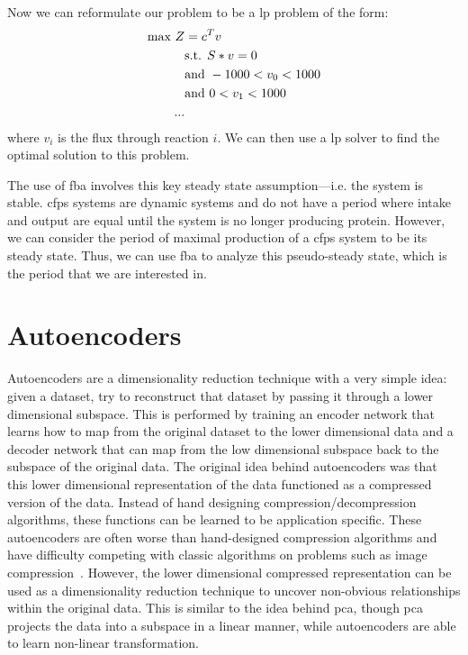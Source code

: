 Now we can reformulate our problem to be a \gls{lp} problem of the form:
\begin{equation}
\centering
\begin{split}
\text{max } Z &= c^Tv \\
&\text{s.t. } S * v = 0 \\
&\text{and } -1000 < v_0 < 1000 \\
&\text{and } 0 < v_1 < 1000 \\
...
\end{split}
\end{equation}
where $v_i$ is the flux through reaction $i$.
We can then use a \gls{lp} solver to find the optimal solution to this problem.

The use of \gls{fba} involves this key steady state assumption---i.e. the system is stable.
\gls{cfps} systems are dynamic systems and do not have a period where intake and output are equal until the system is no longer producing protein.
However, we can consider the period of maximal production of a \gls{cfps} system to be its steady state.
Thus, we can use \gls{fba} to analyze this pseudo-steady state, which is the period that we are interested in.


\section{Autoencoders}
Autoencoders are a dimensionality reduction technique with a very simple idea: given a dataset, try to reconstruct that dataset by passing it through a lower dimensional subspace.
This is performed by training an encoder network that learns how to map from the original dataset to the lower dimensional data and a decoder network that can map from the low dimensional subspace back to the subspace of the original data.
The original idea behind autoencoders was that this lower dimensional representation of the data functioned as a compressed version of the data.
Instead of hand designing compression/decompression algorithms, these functions can be learned to be application specific.
These autoencoders are often worse than hand-designed compression algorithms and have difficulty competing with classic algorithms on problems such as image compression~\cite{theis2017lossy}.
However, the lower dimensional compressed representation can be used as a dimensionality reduction technique to uncover non-obvious relationships within the original data.
This is similar to the idea behind \gls{pca}, though \gls{pca} projects the data into a subspace in a linear manner, while autoencoders are able to learn non-linear transformation.

